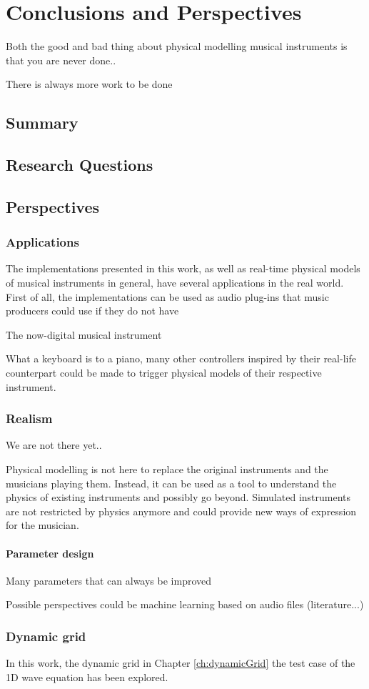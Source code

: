 \chapter{Conclusions and Perspectives}\label{ch:conclusion}
Both the good and bad thing about physical modelling musical instruments is that you are never done..

There is always more work to be done

\section{Summary}


\section{Research Questions}

\section{Perspectives}
\subsection{Applications}
The implementations presented in this work, as well as real-time physical models of musical instruments in general, have several applications in the real world. First of all, the implementations can be used as audio plug-ins that music producers could use if they do not have


The now-digital musical instrument 

What a keyboard is to a piano, many other controllers inspired by their real-life counterpart could be made to trigger physical models of their respective instrument.
\subsection{Realism}
We are not there yet.. 

Physical modelling is not here to replace the original instruments and the musicians playing them. Instead, it can be used as a tool to understand the physics of existing instruments and possibly go beyond. Simulated instruments are not restricted by physics anymore and could provide new ways of expression for the musician. 

\subsubsection{Parameter design}
Many parameters that can always be improved

Possible perspectives could be machine learning based on audio files (literature...)

\subsection{Dynamic grid}
In this work, the dynamic grid in Chapter \ref{ch:dynamicGrid} the test case of the 1D wave equation has been explored. 